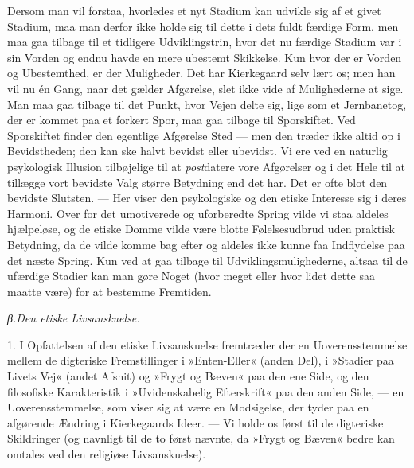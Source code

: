 \documentclass[12pt,a4paper,openany]{book}
\newcommand{\opage}[1]{\marginnote{\footnotesize\textit{[#1]}}}
\begin{document}
Dersom man vil forstaa, hvorledes et nyt Stadium
kan udvikle sig af et givet Stadium, maa man derfor
ikke holde sig til dette i dets fuldt færdige Form, men
maa gaa tilbage til et tidligere Udviklingstrin, hvor det
nu færdige Stadium var i sin Vorden og endnu havde en
mere ubestemt Skikkelse. Kun hvor der er Vorden og
Ubestemthed, er der Muligheder. Det har Kierkegaard
selv lært os; men han vil nu én Gang, naar det gælder
Afgørelse, slet ikke vide af Mulighederne at sige. Man
maa gaa tilbage til det Punkt, hvor Vejen delte sig, lige
som et Jernbanetog, der er kommet paa et forkert Spor,
maa gaa tilbage til Sporskiftet. Ved Sporskiftet finder
den egentlige Afgørelse Sted --- men den træder ikke
altid op i Bevidstheden; den kan ske halvt bevidst eller
ubevidst. Vi ere ved en naturlig psykologisk Illusion
tilbøjelige til at \textit{post}datere vore Afgørelser og i det Hele
til at tillægge vort bevidste Valg større Betydning end
det har. Det er ofte blot den bevidste Slutsten. ---
Her viser den psykologiske og den etiske Interesse
sig i deres Harmoni. Over for det umotiverede og uforberedte
Spring vilde vi staa aldeles hjælpeløse, og de
etiske Domme vilde være blotte Følelsesudbrud uden
praktisk Betydning, da de vilde komme bag efter og
aldeles ikke kunne faa Indflydelse paa det næste Spring.
Kun ved at gaa tilbage til Udviklingsmulighederne, altsaa
til de ufærdige Stadier kan man gøre Noget (hvor
meget eller hvor lidet dette saa maatte være) for at bestemme
Fremtiden.
\opage{92}\begin{center}\textit{β.\enspace Den etiske Livsanskuelse.}\end{center}

1. I Opfattelsen af den etiske Livsanskuelse fremtræder
der en Uoverensstemmelse mellem de digteriske
Fremstillinger i »Enten-Eller« (anden Del), i »Stadier paa
Livets Vej« (andet Afsnit) og »Frygt og Bæven« paa den
ene Side, og den filosofiske Karakteristik i »Uvidenskabelig
Efterskrift« paa den anden Side, --- en Uoverensstemmelse,
som viser sig at være en Modsigelse, der tyder
paa en afgørende Ændring i Kierkegaards Ideer. --- Vi
holde os først til de digteriske Skildringer (og navnligt
til de to først nævnte, da »Frygt og Bæven« bedre kan
omtales ved den religiøse Livsanskuelse).
\end{document}
